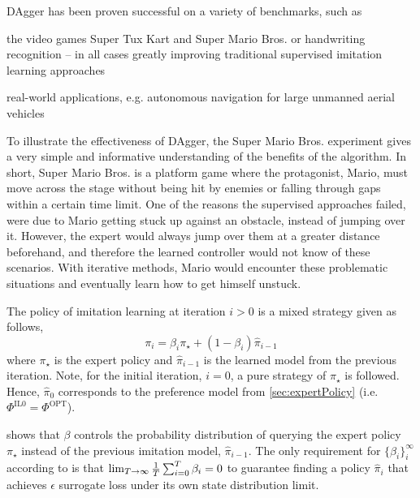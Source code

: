DAgger has been proven successful on a variety of benchmarks, such as
\begin{enumerate*}[label={{}}]
    \item the video games Super Tux Kart and Super Mario Bros. or
    handwriting recognition -- in all cases greatly improving traditional 
    supervised imitation learning approaches \cite{RossGB11}
    \item real-world applications, e.g. autonomous navigation for large 
    unmanned 
    aerial vehicles \cite{Ross13}
\end{enumerate*}
To illustrate the effectiveness of DAgger, the Super Mario Bros. experiment 
gives a very simple and informative understanding of the benefits of the 
algorithm. In short, Super Mario Bros. is a platform game where the 
protagonist, Mario, must move across the stage without being hit by enemies or 
falling through gaps within a certain time limit. 
One of the reasons the supervised approaches failed, were due to Mario getting 
stuck up against an obstacle, instead of jumping over it. 
However, the expert would always jump over them at a greater distance 
beforehand, and therefore the learned controller would not know of these 
scenarios. 
With iterative methods, Mario would encounter these problematic situations and 
eventually learn how to get himself unstuck. 

The policy of imitation learning at iteration $i>0$ is a mixed strategy given 
as follows, 
\begin{equation}\label{eq:il}
\pi_i = \beta_i\pi_\star + (1-\beta_i)\hat{\pi}_{i-1}
\end{equation}
where $\pi_\star$ is the expert policy and $\hat{\pi}_{i-1}$ is the learned 
model from the previous iteration. 
Note, for the initial iteration, $i=0$, a pure strategy of $\pi_\star$ is 
followed. Hence, $\hat{\pi}_0$ corresponds to the preference model from 
\cref{sec:expertPolicy} (i.e. $\Phi^{\text{IL}0}=\Phi^{\text{OPT}}$). 

 shows that $\beta$ controls the probability distribution of 
querying the expert policy $\pi_\star$ instead of the previous imitation model, 
$\hat{\pi}_{i-1}$.  
The only requirement for $\{\beta_i\}_i^\infty$ according to \cite{RossGB11} is 
that $\limit{\frac{1}{T}\sum_{i=0}^T\beta_i}{T\to\infty}{0}$ to guarantee 
finding a policy $\hat{\pi}_i$ that achieves $\epsilon$ surrogate loss under 
its own state distribution limit.


